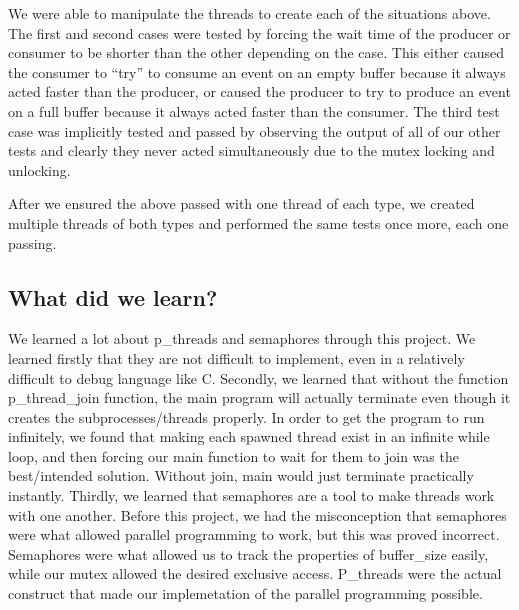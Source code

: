 \documentclass{article}
\begin{document}
We were able to manipulate the threads to create each of the situations above. The first and second cases were tested by forcing the wait time of the producer or consumer to be shorter than the other depending on the case. This either caused the consumer to “try” to consume an event on an empty buffer because it always acted faster than the producer, or caused the producer to try to produce an event on a full buffer because it always acted faster than the consumer. The third test case was implicitly tested and passed by observing the output of all of our other tests and clearly they never acted simultaneously due to the mutex locking and unlocking.

After we ensured the above passed with one thread of each type, we created multiple threads of both types and performed the same tests once more, each one passing.

\subsection{What did we learn?}

We learned a lot about p\_threads and semaphores through this project. We learned firstly that they are not difficult to implement, even in a relatively difficult to debug language like C. Secondly, we learned that without the function p\_thread\_join function, the main program will actually terminate even though it creates the subprocesses/threads properly. In order to get the program to run infinitely, we found that making each spawned thread exist in an infinite while loop, and then forcing our main function to wait for them to join was the best/intended solution. Without join, main would just terminate practically instantly. Thirdly, we learned that semaphores are a tool to make threads work with one another. Before this project, we had the misconception that semaphores were what allowed parallel programming to work, but this was proved incorrect. Semaphores were what allowed us to track the properties of buffer\_size easily, while our mutex allowed the desired exclusive access. P\_threads were the actual construct that made our implemetation of the parallel programming possible. 
\end{document}
